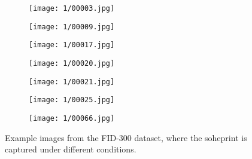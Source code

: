 \documentclass[draft,final]{vutinfth} %
\begin{document}
\begin{figure}[h]
  \centering
  \begin{subfigure}[t]{0.13\columnwidth}
    \centering
    \texttt{[image: 1/00003.jpg]}
	\caption{}
	\label{fig:int:varying:3}
  \end{subfigure}
   \begin{subfigure}[t]{0.13\columnwidth}
    \centering
    \texttt{[image: 1/00009.jpg]}
	\caption{}
	\label{fig:int:varying:9}
  \end{subfigure}
 \begin{subfigure}[t]{0.13\columnwidth}
    \centering
    \texttt{[image: 1/00017.jpg]}
	\caption{}
	\label{fig:int:varying:17}
  \end{subfigure}
 \begin{subfigure}[t]{0.13\columnwidth}
    \centering
    \texttt{[image: 1/00020.jpg]}
	\caption{}
	\label{fig:int:varying:20}
  \end{subfigure}
 \begin{subfigure}[t]{0.13\columnwidth}
    \centering
    \texttt{[image: 1/00021.jpg]}
	\caption{}
	\label{fig:int:varying:21}
  \end{subfigure}
 \begin{subfigure}[t]{0.13\columnwidth}
    \centering
    \texttt{[image: 1/00025.jpg]}
	\caption{}
	\label{fig:int:varying:25}
  \end{subfigure}
 \begin{subfigure}[t]{0.13\columnwidth}
    \centering
    \texttt{[image: 1/00066.jpg]}
	\caption{}
	\label{fig:int:varying:66}
  \end{subfigure}
  \caption{Example images from the FID-300 \cite{kortylewski2014unsupervised} dataset, where the soheprint is captured under different conditions.}
  \label{fig:int:varying}
\end{figure}
\end{document}

